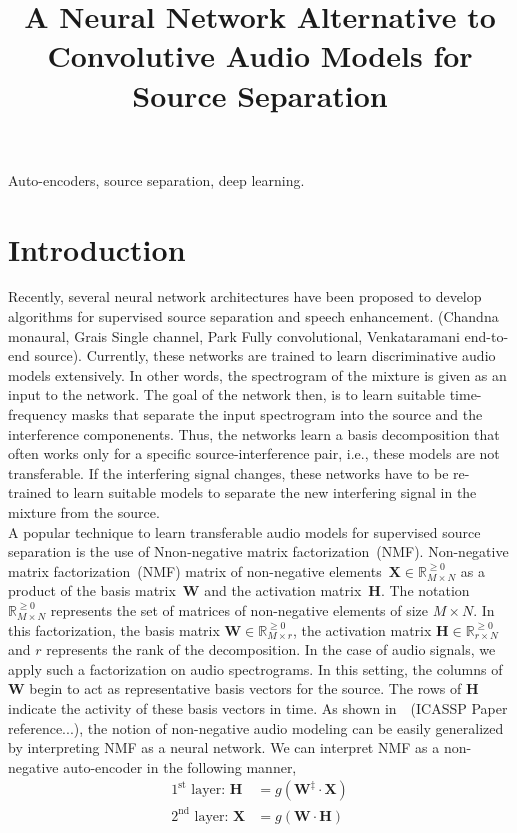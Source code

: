 \documentclass{article}
\title{A Neural Network Alternative to Convolutive Audio Models for Source Separation}
\begin{document}
%

\maketitle
%
\begin{abstract}
\end{abstract}
%
\begin{keywords}
Auto-encoders, source separation, deep learning.
\end{keywords}
%
\section{Introduction}
\label{sec:intro}
Recently, several neural network architectures have been proposed to develop algorithms for supervised source separation and speech enhancement. (Chandna monaural, Grais Single channel, Park Fully convolutional, Venkataramani end-to-end source). Currently, these networks are trained to learn discriminative audio models extensively. In other words, the spectrogram of the mixture is given as an input to the network. The goal of the network then, is to learn suitable time-frequency masks that separate the input spectrogram into the source and the interference componenents. Thus, the networks learn a basis decomposition that often works only for a specific source-interference pair, i.e., these models are not transferable. If the interfering signal changes, these networks have to be re-trained to learn suitable models to separate the new interfering signal in the mixture from the source. \\

A popular technique to learn transferable audio models for supervised source separation is the use of Nnon-negative matrix factorization~(NMF). Non-negative matrix factorization~(NMF) matrix of non-negative elements~$\mathbf{X}\in \mathbb{R}_{M\times N}^{\geq0}$ as a product of the basis matrix~$\mathbf{W}$ and the activation matrix~$\mathbf{H}$. The notation $\mathbb{R}_{M \times N}^{\geq0}$ represents the set of matrices of non-negative elements of size $M \times N$. In this factorization, the basis matrix $\mathbf{W} \in \mathbb{R}_{M \times r}^{\geq{0}}$, the activation matrix $\mathbf{H} \in \mathbb{R}_{r \times N}^{\geq{0}}$ and $r$ represents the rank of the decomposition. In the case of audio signals, we apply such a factorization on audio spectrograms. In this setting, the columns of $\mathbf{W}$ begin to act as representative basis vectors for the source. The rows of $\mathbf{H}$ indicate the activity of these basis vectors in time. As shown in~~\cite{}(ICASSP Paper reference...), the notion of non-negative audio modeling can be easily generalized by interpreting NMF as a neural network. We can interpret NMF as a non-negative auto-encoder in the following manner,
\begin{align}
    \text{$1^{\text{st}}$ layer:~}\mathbf{H} &= g(\mathbf{W^{\ddagger}} \cdot \mathbf{X}) \\
    \text{$2^{\text{nd}}$ layer:~}\mathbf{X} &= g(\mathbf{W} \cdot \mathbf{H})
    \label{eq:nmfae}
\end{align}
\end{document}
